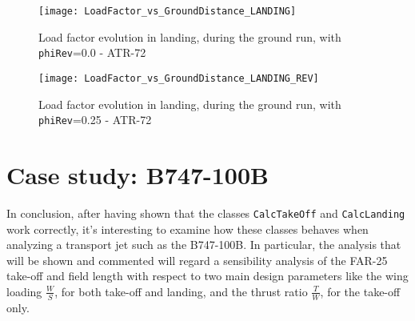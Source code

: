 %
\begin{figure}[!b]
\centering
\texttt{[image: LoadFactor\_vs\_GroundDistance\_LANDING]}
\caption{Load factor evolution in landing, during the ground run, with \lstinline[language=Java]!phiRev!=0.0 - ATR-72}
\end{figure}
%
\begin{figure}[!b]
\centering
\texttt{[image: LoadFactor\_vs\_GroundDistance\_LANDING\_REV]}
\caption{Load factor evolution in landing, during the ground run, with \lstinline[language=Java]!phiRev!=0.25 - ATR-72}
\label{fig:LandingEnd}
\end{figure}
%
%
\clearpage
%
\section{Case study: B747-100B}
%
In conclusion, after having shown that the classes \lstinline[language=Java]!CalcTakeOff! and \lstinline[language=Java]!CalcLanding! work correctly, it's interesting to examine how these classes behaves when analyzing a transport jet such as the B747-100B. In particular, the analysis that will be shown and commented will regard a sensibility analysis of the \gls{FAR}-25 take-off and field length with respect to two main design parameters like the wing loading $\frac{W}{S}$, for both take-off and landing, and the thrust ratio $\frac{T}{W}$, for the take-off only.

